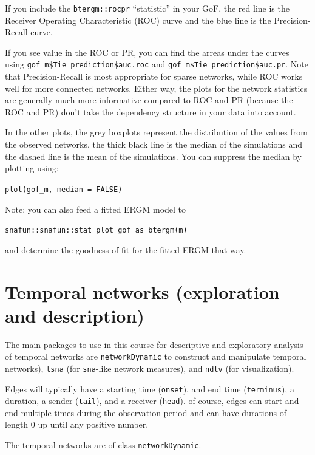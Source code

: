 \documentclass[
]{article}
\begin{document}
If you include the \texttt{btergm::rocpr} ``statistic'' in your GoF, the
{red} line is the Receiver Operating Characteristic (ROC) curve and the
{blue} line is the Precision-Recall curve.

If you see value in the ROC or PR, you can find the arreas under the
curves using
\texttt{gof\_m\$\textasciigrave{}Tie\ prediction\textasciigrave{}\$auc.roc}
and
\texttt{gof\_m\$\textasciigrave{}Tie\ prediction\textasciigrave{}\$auc.pr}.
Note that Precision-Recall is most appropriate for sparse networks,
while ROC works well for more connected networks. Either way, the plots
for the network statistics are generally much more informative compared
to ROC and PR (because the ROC and PR) don't take the dependency
structure in your data into account.

In the other plots, the grey boxplots represent the distribution of the
values from the observed networks, the thick black line is the median of
the simulations and the dashed line is the mean of the simulations. You
can suppress the median by plotting using:

\texttt{plot(gof\_m,\ median\ =\ FALSE)}

Note: you can also feed a fitted ERGM model to

\texttt{snafun::snafun::stat\_plot\_gof\_as\_btergm(m)}

and determine the goodness-of-fit for the fitted ERGM that way.

\hypertarget{temporal-networks-exploration-and-description}{%
\section{Temporal networks (exploration and
description)}\label{temporal-networks-exploration-and-description}}

The main packages to use in this course for descriptive and exploratory
analysis of temporal networks are \texttt{networkDynamic} to construct
and manipulate temporal networks), \texttt{tsna} (for \texttt{sna}-like
network measures), and \texttt{ndtv} (for visualization).

Edges will typically have a starting time (\texttt{onset}), and end time
(\texttt{terminus}), a duration, a sender (\texttt{tail}), and a
receiver (\texttt{head}). of course, edges can start and end multiple
times during the observation period and can have durations of length 0
up until any positive number.

The temporal networks are of class \texttt{networkDynamic}.
\end{document}
